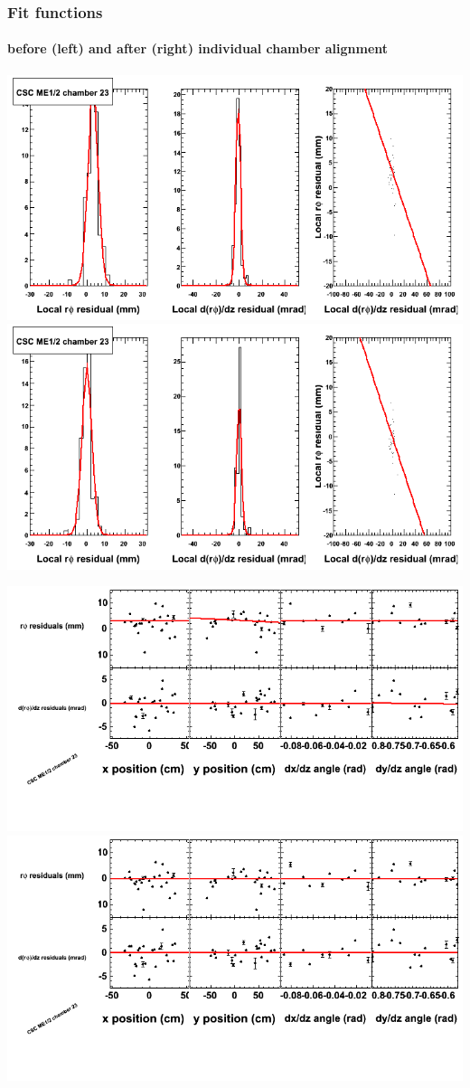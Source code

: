 \documentclass[compress]{beamer}
\begin{document}
\begin{frame}
\frametitle{Fit functions}
\framesubtitle{before (left) and after (right) individual chamber alignment}
\includegraphics[width=0.5\linewidth]{ringfits_3dof/beforefit_MEp12_23_bellcurve.png} \includegraphics[width=0.5\linewidth]{ringfits_3dof/afterfit_MEp12_23_bellcurve.png}

\includegraphics[width=0.5\linewidth]{ringfits_3dof/beforefit_MEp12_23_polynomials.png} \includegraphics[width=0.5\linewidth]{ringfits_3dof/afterfit_MEp12_23_polynomials.png}
\end{frame}
\end{document}
